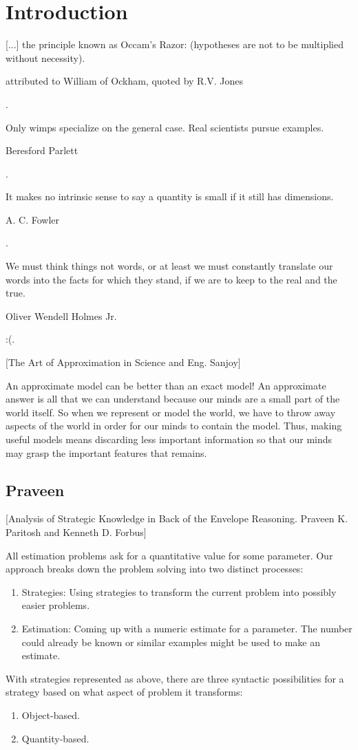 \section{Introduction}
\newcommand{\lpos}{x} %
\newcommand{\lvel}{v} %
%
\epigraph{[...] the principle known as Occam's Razor:  (hypotheses are not to be multiplied without necessity).}{attributed to William of Ockham, quoted by R.V. Jones}{\citep[p.95]{gibbings:2011}.}
%
\epigraph{Only wimps specialize on the general case. Real scientists pursue examples.}{Beresford Parlett}{\citep{berry:1995}.}
%
\epigraph{It makes no intrinsic sense to say a quantity is small if it still has dimensions.}{A. C. Fowler}{\citep{fowler:2003}.}
%
\epigraph{We must think things not words, or at least we must constantly translate our words into the facts for which they stand, if we are to keep to the real and the true.}{Oliver Wendell Holmes Jr.}{:(.}
%

[The Art of Approximation in Science and Eng. Sanjoy]

An approximate model can be better than an exact model! An approximate answer is all that we can understand because our minds are a small part of the world itself. So when we represent or model the world, we have to throw away aspects of the world in order for our minds to contain the model. Thus, making useful models means discarding less important information so that our minds may grasp the important features that remains.


\subsection{Praveen}
[Analysis of Strategic Knowledge in Back of the Envelope Reasoning. Praveen K. Paritosh and Kenneth D. Forbus]

All estimation problems ask for a quantitative value for some parameter. Our approach breaks down the problem solving into two distinct processes:
%
\begin{enumerate}
\item Strategies: Using strategies to transform the current problem into possibly easier problems.
\item Estimation: Coming up with a numeric estimate for a parameter. The number could already be known or similar examples might be used to make an estimate.
\end{enumerate}

With strategies represented as above, there are three syntactic possibilities for a strategy based on what aspect of problem it transforms:
%
\begin{enumerate}
\item Object-based.
\item Quantity-based.
\end{enumerate}

